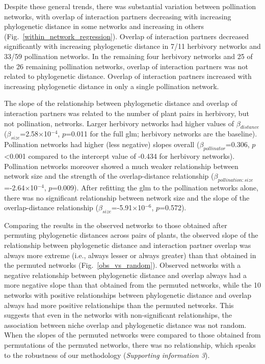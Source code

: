 \documentclass[12pt]{article}
\begin{document}
\begin{spacing}{1.5}
    Despite these general trends, there was substantial variation between 
    pollination networks, with overlap of interaction partners decreasing 
    with increasing phylogenetic distance in some networks and increasing 
    in others (Fig.~\ref{within_network_regression}). Overlap of 
    interaction partners decreased significantly with increasing 
    phylogenetic distance in 7/11 herbivory networks and 33/59 
    pollination networks. In the remaining four herbivory networks and 
    25 of the 26 remaining pollination networks, overlap of interaction 
    partners was not related to phylogenetic distance. Overlap of 
    interaction partners increased with increasing phylogenetic distance 
    in only a single pollination network.%


    The slope of the relationship between phylogenetic distance and 
    overlap of interaction partners was related to the number of plant pairs 
    in herbivory, but not pollination, networks. Larger herbivory networks 
    had higher values of $\beta_{distance}$ 
    ($\beta_{size}$=2.58$\times$10$^{-4}$, $p$=0.011 for the full glm; 
    herbivory networks are the baseline). Pollination networks had 
    higher (less negative) slopes overall ($\beta_{pollinator}$=0.306, 
    $p$\textless0.001 compared to the intercept value of -0.434 for 
    herbivory networks). Pollination networks moreover showed a 
    much weaker relationship between network size and the strength of the 
    overlap-distance relationship 
    ($\beta_{pollination:size}$=-2.64$\times$10$^{-4}$, $p$=0.009). 
    After refitting the glm to the pollination networks alone, there was 
    no significant relationship between network size and the slope of 
    the overlap-distance relationship ($\beta_{size}$=-5.91$\times$10$^{-6}$, 
    $p$=0.572).


    Comparing the results in the observed networks to those obtained after 
    permuting phylogenetic distances across pairs of plants, the observed 
    slope of the relationship between phylogenetic distance and interaction 
    partner overlap was always more extreme (i.e., always lesser or always 
    greater) than that obtained in the permuted networks (Fig.~\ref{obs_vs_random}).
    Observed networks with a negative relationship between phylogenetic distance 
    and overlap always had a more negative slope than that obtained from the 
    permuted networks, while the 10 networks with positive relationships 
    between phylogenetic distance and overlap always had more positive 
    relationships than the permuted networks. This suggests that even in 
    the networks with non-significant relationships, the association between niche overlap and 
    phylogenetic distance was not random. When the slopes of the permuted 
    networks were compared to those obtained from permutations of the 
    permuted networks, there was no relationship, which speaks to the robustness of our methodology (\emph{Supporting information 3}). 



\end{spacing}
\end{document}
